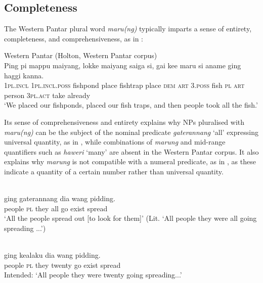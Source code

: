 \subsection{Completeness} %
\label{sec:9:4.1}
The Western Pantar plural word \textit{maru(ng)} typically imparts a sense of entirety, completeness, and comprehensiveness, as in :


\ea%
\label{ex:9:65}
Western Pantar (Holton, Western Pantar corpus)\\
\gll  Ping pi mappu maiyang, lokke maiyang saiga si, gai ke{{\textglotstop}}{e} maru si aname ging haggi kanna. \\
    \textsc{1pl.incl}  \textsc{1pl.incl.poss} fishpond place fishtrap place \textsc{dem} \textsc{art}  \textsc{3.poss} fish \textsc{pl} \textsc{art} person \textsc{3pl.act} take already \\
\glt `We placed our fishponds, placed our fish traps,  and then people took all the fish.'
\z


Its sense of comprehensiveness and entirety explains why NPs pluralised with \textit{maru(ng)} can be the subject of the nominal predicate \textit{gaterannang} `all' expressing universal quantity, as in , while combinations of \textit{marung} and mid-range quantifiers such as \textit{haweri} `many' are absent in the Western Pantar corpus. It also explains why \textit{marung} is not compatible with a numeral predicate, as in , as these indicate a quantity of a certain number rather than universal quantity.


\ea%
\label{ex:9:66}
 \\
 ging gaterannang dia wang pidding. \\
   people \textsc{pl} they all  go exist spread  \\
\glt `All the people spread out [to look for them]' \citep{Holton2012}
(Lit. `All people they were all going spreading ...')
\z








\ea%
\label{ex:9:67}
 \\
 ging kealaku dia wang pidding. \\
    people \textsc{pl} they twenty go exist spread \\
 \glt Intended: `All people they were twenty going spreading...'
\z






